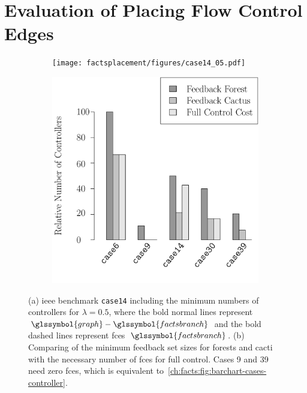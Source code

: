 \section{Evaluation of Placing Flow Control Edges}
\label{ch:facts-branches:sec:flowcontrolbranches}
%
\begin{figure}[t!]%
    \centering
    \begin{subfigure}[t]{.492\textwidth}
        \centering
        \texttt{[image: factsplacement/figures/case14\_05.pdf]}
        \caption{}
        \label{ch:facts:fig:graph-subgrids}
    \end{subfigure}%
    \hfill
    \begin{subfigure}[t]{.492\textwidth}
        \centering
        \includegraphics[width=\textwidth, page=1, trim=0cm 1.5cm 0cm 0cm]{factsplacement/figures/plotBarchartCasesVsController.pdf}
        \caption{}
        \label{ch:facts:fig:structural-results}
    \end{subfigure}%
    \caption[Minimum number of controllers to reach full control.]{
    (a) \gls{ieee} benchmark \texttt{case14} including the minimum numbers of
            controllers for \mbox{$\lambda = 0.5$}, where the bold normal lines
            represent~$\glssymbol{graph}-\glssymbol{factsbranch}$ and the bold
            dashed lines represent \gls{fce}s~$\glssymbol{factsbranch}$.
    (b) Comparing of the minimum feedback set sizes for forests and
        cacti with the necessary number of \gls{fce}s for full control.
        Cases 9 and 39 need zero \gls{fce}s, which is equivalent
        to~\cref{ch:facts:fig:barchart-cases-controller}.
    }
\end{figure}
